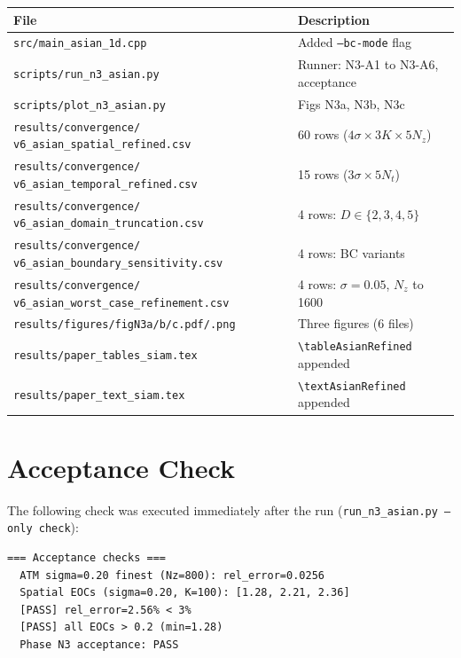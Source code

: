 \documentclass[11pt,a4paper]{article}
\newcommand{\Nz}{N_z}
\newcommand{\Nt}{N_t}
\begin{document}
\begin{center}
\footnotesize
\begin{tabular}{@{}p{8.5cm}p{5.5cm}@{}}
\toprule
File & Description \\
\midrule
\texttt{src/main\_asian\_1d.cpp} &
  Added \texttt{--bc-mode} flag \\
\texttt{scripts/run\_n3\_asian.py} &
  Runner: N3-A1 to N3-A6, acceptance \\
\texttt{scripts/plot\_n3\_asian.py} &
  Figs N3a, N3b, N3c \\
\texttt{results/convergence/}%
\texttt{v6\_asian\_spatial\_refined.csv} &
  60 rows ($4\sigma\!\times\!3K\!\times\!5\Nz$) \\
\texttt{results/convergence/}%
\texttt{v6\_asian\_temporal\_refined.csv} &
  15 rows ($3\sigma\!\times\!5\Nt$) \\
\texttt{results/convergence/}%
\texttt{v6\_asian\_domain\_truncation.csv} &
  4 rows: $D\in\{2,3,4,5\}$ \\
\texttt{results/convergence/}%
\texttt{v6\_asian\_boundary\_sensitivity.csv} &
  4 rows: BC variants \\
\texttt{results/convergence/}%
\texttt{v6\_asian\_worst\_case\_refinement.csv} &
  4 rows: $\sigma\!=\!0.05$, $\Nz$ to 1600 \\
\texttt{results/figures/figN3a/b/c.pdf/.png} &
  Three figures (6 files) \\
\texttt{results/paper\_tables\_siam.tex} &
  \verb|\tableAsianRefined| appended \\
\texttt{results/paper\_text\_siam.tex} &
  \verb|\textAsianRefined| appended \\
\bottomrule
\end{tabular}
\end{center}

\appendix
\section{Acceptance Check}
\label{app:acceptance}

The following check was executed immediately after the run
(\texttt{run\_n3\_asian.py --only check}):
\begin{verbatim}
=== Acceptance checks ===
  ATM sigma=0.20 finest (Nz=800): rel_error=0.0256
  Spatial EOCs (sigma=0.20, K=100): [1.28, 2.21, 2.36]
  [PASS] rel_error=2.56% < 3%
  [PASS] all EOCs > 0.2 (min=1.28)
  Phase N3 acceptance: PASS
\end{verbatim}
\end{document}

